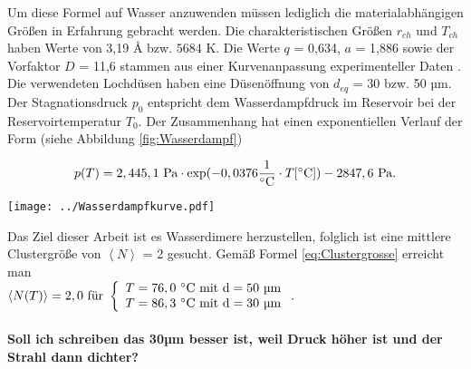 Um diese Formel auf Wasser anzuwenden müssen lediglich die materialabhängigen Größen in Erfahrung gebracht werden. Die charakteristischen Größen $r_{ch}$ und $T_{ch}$ haben Werte von 3,19 \AA{} bzw. $5684$ K. Die Werte $q$ = 0,634, $a$ = 1,886 sowie der Vorfaktor $D$ = 11,6 stammen aus einer Kurvenanpassung experimenteller Daten \cite{bobbert2002}. Die verwendeten Lochdüsen haben eine Düsenöffnung von $d_{eq}$ = 30 bzw. 50 µm. Der Stagnationsdruck $p_0$ entspricht dem Wasserdampfdruck im Reservoir bei der Reservoirtemperatur $T_0$. Der Zusammenhang hat einen exponentiellen Verlauf der Form (siehe Abbildung \ref{fig:Wasserdampf})

\begin{equation} \label{eq:Clustergrosse}
p(T) = 2,445,1\ \textmd{Pa} \cdot \textmd{exp}(-0,0376 \frac{1}{^{\circ} \textmd{C}} \cdot T [^{\circ} \textmd{C}]) - 2847,6\ \textmd{Pa} .
\end{equation}

\begin{center}
\begin{minipage}{\linewidth}
\centering
\texttt{[image: ../Wasserdampfkurve.pdf]}%
 \label{fig:Wasserdampf}
\end{minipage} 
\end{center}

Das Ziel dieser Arbeit ist es Wasserdimere herzustellen, folglich ist eine mittlere Clustergröße von $\left \langle N \right\rangle$ = 2 gesucht. Gemäß Formel \ref{eq:Clustergrosse} erreicht man \\ $\left \langle N(T) \right\rangle = 2,0 \textmd{ für }
\left\{ %
   \begin{array}{l}
   T = 76,0\ ^{\circ} \textmd{C} \textmd{ mit d}= 50 \textmd{ µm} \\ 
   T = 86,3\ ^{\circ} \textmd{C} \textmd{ mit d}= 30 \textmd{ µm}
   \end{array}
   \right. .$\\ \\
 \textbf{Soll ich schreiben das 30µm besser ist, weil Druck höher ist und der Strahl dann dichter?}
